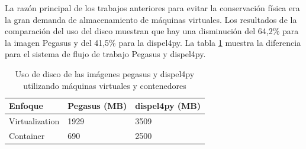 La razón principal de los trabajos anteriores para evitar la conservación física era la gran demanda de almacenamiento de máquinas virtuales. 
Los resultados de la comparación del uso del disco muestran que hay una disminución del 64,2\% para la imagen Pegasus y del 41,5\% para la dispel4py. La tabla \ref{storage-reduce} muestra la diferencia para el sistema de flujo de trabajo Pegasus y dispel4py.


\begin{table}[t]
\centering
\begin{tabular}{|l|l|l|}
\hline
Enfoque        & Pegasus (MB) & dispel4py (MB) \\ \hline
Virtualization & 1929         & 3509 \\ \hline
Container      & 690          & 2500 \\ \hline
\end{tabular}
\caption[Comparación de uso de disco entre VMs y contenedores]{Uso de disco de las imágenes pegasus y dispel4py utilizando máquinas virtuales y contenedores}
\label{storage-reduce}
\end{table}
